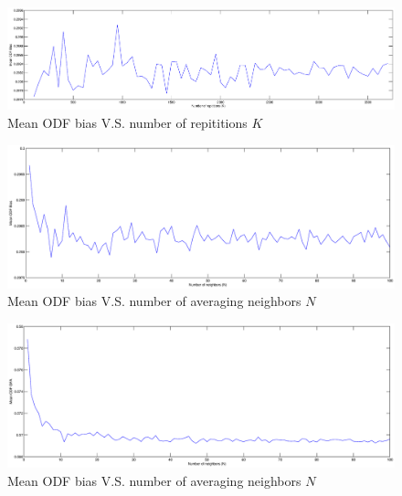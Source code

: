 \documentclass[10pt]{article}
\begin{document}
\begin{figure}[H]
  \includegraphics[width=\textwidth]{figures/mean_ODF_bias.eps}
  \caption{Mean ODF bias V.S. number of repititions $K$}
\end{figure}

\begin{figure}[H]
  \includegraphics[width=\textwidth]{figures/neighbor_bias.eps}
  \caption{Mean ODF bias V.S. number of averaging neighbors $N$}
\end{figure}

\begin{figure}[H]
  \includegraphics[width=\textwidth]{figures/mean_ODF_gfa.eps}
  \caption{Mean ODF bias V.S. number of averaging neighbors $N$}
\end{figure}
\end{document}

